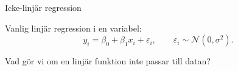 \documentclass[10pt,english]{beamer}
\begin{document}
\begin{frame}{Icke-linjär regression}

    Vanlig linjär regression i en variabel:
    \begin{equation*}
        y_i = \beta_0 + \beta_1 x_i + \varepsilon_i, \qquad \varepsilon_i \sim \mathcal{N}(0, \sigma^2).
    \end{equation*}

    Vad gör vi om en linjär funktion inte passar till datan?

    
\end{frame}
\end{document}
